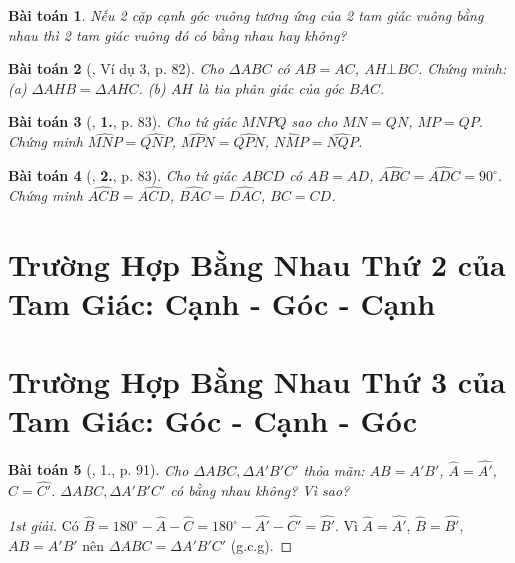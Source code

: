 \documentclass{article}
\newtheorem{baitoan}{Bài toán}
\begin{document}
\begin{baitoan}
	Nếu 2 cặp cạnh góc vuông tương ứng của 2 tam giác vuông bằng nhau thì 2 tam giác vuông đó có bằng nhau hay không?
\end{baitoan}

\begin{baitoan}[\cite{SGK_Toan_7_Canh_Dieu_tap_2}, Ví dụ 3, p. 82]
	Cho $\Delta ABC$ có $AB = AC$, $AH\bot BC$. Chứng minh: (a) $\Delta AHB = \Delta AHC$. (b) $AH$ là tia phân giác của góc $BAC$.
\end{baitoan}

\begin{baitoan}[\cite{SGK_Toan_7_Canh_Dieu_tap_2}, \textbf{1.}, p. 83]
	Cho tứ giác $MNPQ$ sao cho $MN = QN$, $MP = QP$. Chứng minh $\widehat{MNP} = \widehat{QNP}$, $\widehat{MPN} = \widehat{QPN}$, $\widehat{NMP} = \widehat{NQP}$. 
\end{baitoan}

\begin{baitoan}[\cite{SGK_Toan_7_Canh_Dieu_tap_2}, \textbf{2.}, p. 83]
	Cho tứ giác $ABCD$ có $AB = AD$, $\widehat{ABC} = \widehat{ADC} = 90^\circ$. Chứng minh $\widehat{ACB} = \widehat{ACD}$, $\widehat{BAC} = \widehat{DAC}$, $BC = CD$.
\end{baitoan}


\section{Trường Hợp Bằng Nhau Thứ 2 của Tam Giác: Cạnh - Góc - Cạnh}


\section{Trường Hợp Bằng Nhau Thứ 3 của Tam Giác: Góc - Cạnh - Góc}

\begin{baitoan}[\cite{SGK_Toan_7_Canh_Dieu_tap_2}, 1., p. 91]
	Cho $\Delta ABC,\Delta A'B'C'$ thỏa mãn: $AB = A'B'$, $\widehat{A} = \widehat{A'}$, $\widehat{C} = \widehat{C'}$. $\Delta ABC,\Delta A'B'C'$ có bằng nhau không? Vì sao?
\end{baitoan}

\begin{proof}[1st giải]
	Có $\widehat{B} = 180^\circ - \widehat{A} - \widehat{C} = 180^\circ - \widehat{A'} - \widehat{C'} = \widehat{B'}$. Vì $\widehat{A} = \widehat{A'}$, $\widehat{B} = \widehat{B'}$, $AB = A'B'$ nên $\Delta ABC = \Delta A'B'C'$ (g.c.g).
\end{proof}
\end{document}
